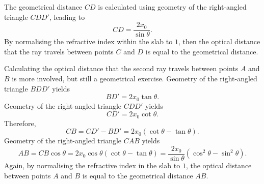 \documentclass[12pt]{../style-files/ociamthesis}
\begin{document}
	The geometrical distance $CD$ is calculated using geometry of the right-angled triangle $CDD'$, leading to
	\begin{equation}
	CD = \frac{2x_0}{\sin{\theta}}.
	\end{equation}
	By normalising the refractive index within the slab to $1$, then the optical distance that the ray travels between points $C$ and $D$ is equal to the geometrical distance.
	
	Calculating the optical distance that the second ray travels between points $A$ and $B$ is more involved, but still a geometrical exercise. Geometry of the right-angled triangle $BDD'$ yields
	\begin{equation}
	BD' = 2x_0\tan{\theta}.
	\end{equation}
	Geometry of the right-angled triangle $CDD'$ yields
	\begin{equation}
	CD' = 2x_0\cot{\theta}.
	\end{equation}
	Therefore,
	\begin{equation}
	CB = CD' - BD' = 2x_0(\cot{\theta} - \tan{\theta}).
	\end{equation}
	Geometry of the right-angled triangle $CAB$ yields
	\begin{equation}
	AB = CB \cos{\theta} = 2x_0\cos{\theta}(\cot{\theta} - \tan{\theta}) = \frac{2x_0}{\sin{\theta}}(\cos^2{\theta} - \sin^2{\theta}).
	\end{equation}
	Again, by normalising the refractive index in the slab to $1$, the optical distance between points $A$ and $B$ is equal to the geometrical distance $AB$.
	
\end{document}
